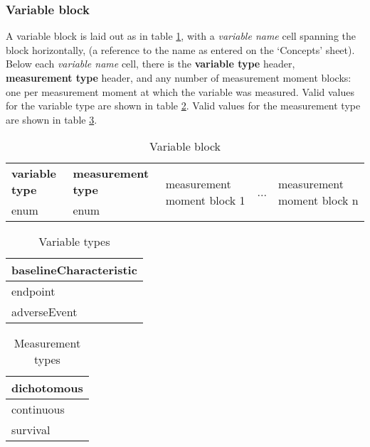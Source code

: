 \documentclass[a4paper,10pt]{article}
\begin{document}
\subsubsection{Variable block}
A variable block is laid out as in table \ref{table:Variable block}, with a \textit{variable name} cell spanning the block horizontally, (a reference to the name as entered on the `Concepts' sheet). Below each \textit{variable name} cell, there is the \textbf{variable type} header, \textbf{measurement type} header, and any number of measurement moment blocks: one per measurement moment at which the variable was measured. Valid values for the variable type are shown in table \ref{table:Variable types}. Valid values for the measurement type are shown in table \ref{table:Measurement types}.

\begin{table}[h]
  \centering
  \caption{Variable block}
  \small
  \label{table:Variable block}
  \begin{tabular}{|l|l|l|l|l|}
    \hline
    \textbf{variable type} &\textbf{ measurement type} & \multirow{2}{*}{measurement moment block 1} & \multirow{2}{*}{...} &  \multirow{2}{*}{measurement moment block n} \\ \cline{1-2}
    enum & enum & & & \\ \hline
  \end{tabular}
\end{table}

\begin{table}[h]
  \centering
  \caption{Variable types}
  \small
  \label{table:Variable types}
  \begin{tabular}{|l|}
    \hline
    baselineCharacteristic \\ \hline
    endpoint \\ \hline
    adverseEvent \\ \hline
  \end{tabular}
\end{table}


\begin{table}[h]
  \centering
  \caption{Measurement types}
  \small
  \label{table:Measurement types}
  \begin{tabular}{|l|}
    \hline
    dichotomous \\ \hline
    continuous \\ \hline
    survival \\ \hline
  \end{tabular}
\end{table}
\end{document}
